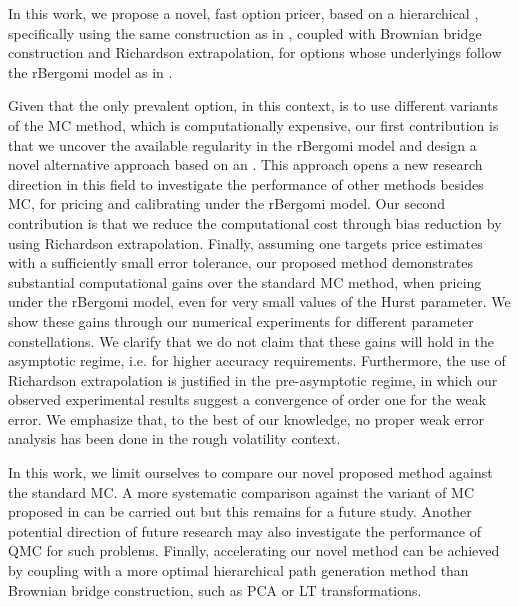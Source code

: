 In this work,  we propose a novel, fast option pricer,  based on a  hierarchical , specifically using the same construction as in \cite{haji2016multi}, coupled with Brownian bridge construction and Richardson extrapolation, for options whose underlyings  follow the rBergomi model as in \cite{bayer2016pricing}. 

Given that the only prevalent option, in this context, is to use different variants of the MC method, which is computationally expensive, our first contribution  is that we uncover the available regularity in the rBergomi model and  design a novel alternative approach based on an  . This approach  opens a new research direction in this field to investigate the performance of other methods besides MC, for pricing and calibrating under the rBergomi model. Our second contribution is that we reduce the computational cost  through bias reduction by using Richardson extrapolation. Finally, assuming one targets price estimates with a sufficiently small error tolerance, our proposed method demonstrates substantial computational gains  over the standard MC method, when pricing under the rBergomi model, even for very small values of the Hurst parameter. We show  these gains through our numerical experiments for  different parameter constellations.  We clarify that we do not claim that these gains will hold in the asymptotic regime, i.e.  for higher accuracy requirements. Furthermore, the use of Richardson extrapolation is justified in the pre-asymptotic regime, in which our observed experimental results suggest a convergence of order one for the weak error. We emphasize that, to the best of our knowledge, no proper weak error analysis has been done in the rough volatility context. 

In this work, we limit ourselves to compare our novel proposed method against the standard MC. A more systematic comparison against the variant of MC proposed in \cite{mccrickerd2018turbocharging}  can be carried out but this remains for a future study. Another  potential direction of future  research may also investigate the performance of QMC for such problems. Finally, accelerating  our novel  method can be achieved  by coupling  with a more optimal hierarchical path generation method than Brownian bridge construction, such as PCA or LT transformations.